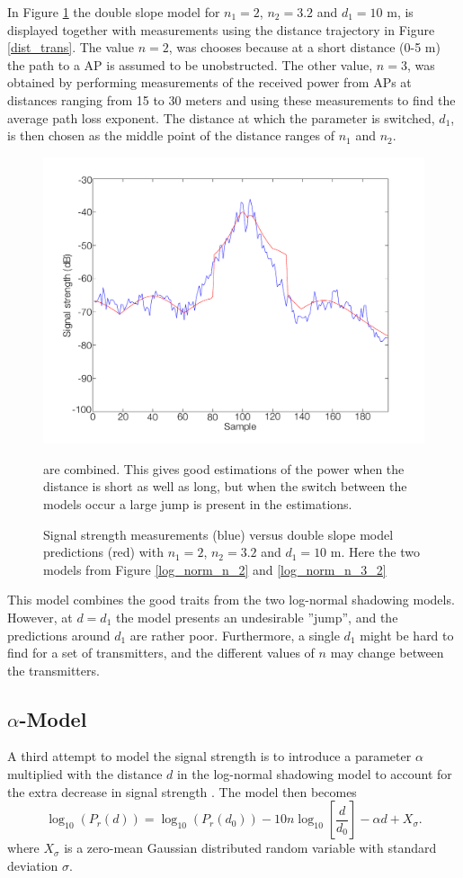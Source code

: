\documentclass{LTHthesis}
\begin{document}
In Figure \ref{double_slope} the double slope model for $n_1=2$, $n_2=3.2$ and $d_1=10$ m, is displayed together with measurements using the distance trajectory in Figure \ref{dist_trans}. The value $n=2$, was chooses because at a short distance (0-5 m) the path to a AP is assumed to be unobstructed. The other value, $n=3$, was obtained by performing measurements of the received power from APs at distances ranging from 15 to 30 meters and using these measurements to find the average path loss exponent. The distance at which the parameter is switched, $d_1$, is then chosen as the middle point of the distance ranges of $n_1$ and $n_2$. 
%
\begin{figure}[!hbt]

\includegraphics[width=1\textwidth ]{images/signal_model/double_slope}
\caption{Signal strength measurements (blue) versus double slope model predictions (red) with $n_1=2$, $n_2=3.2$ and $d_1=10$ m. Here the two models from Figure \ref{log_norm_n_2} and \ref{log_norm_n_3_2}}\label{double_slope} are combined. This gives good estimations of the power when the distance is short as well as long, but when the switch between the models occur a large jump is present in the estimations. 
\end{figure}

This model combines the good traits from the two log-normal shadowing models. However, at $d=d_1$ the model presents an undesirable ''jump'', and the predictions around $d_1$ are rather poor. Furthermore, a single $d_1$ might be hard to find for a set of transmitters, and the different values of $n$ may change between the transmitters.
%
\subsection{$\alpha$-Model} %
%
A third attempt to model the signal strength is to introduce a parameter $\alpha$ multiplied with the distance $d$ in the log-normal shadowing model to account for the extra decrease in signal strength \cite{karlsson92}. The model then becomes
%
\begin{equation}
\log_{10}({P_r(d)})=\log_{10}({P_r(d_0)})-10n\log_{10}\left[{\frac{d}{d_0}}\right] - \alpha d+ X_\sigma.
\end{equation}
%
where $X_\sigma$ is a zero-mean Gaussian distributed random variable with standard deviation $\sigma$.
\end{document}
